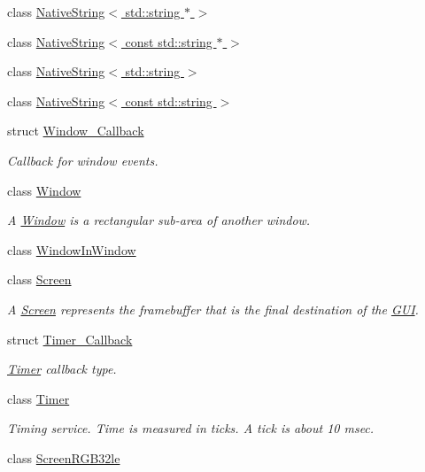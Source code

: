 \begin{DoxyCompactItemize}
class \hyperlink{classGUI_1_1NativeString_3_01std_1_1string_01_5_01_4}{Native\-String$<$ std\-::string $\ast$ $>$}
\item 
class \hyperlink{classGUI_1_1NativeString_3_01const_01std_1_1string_01_5_01_4}{Native\-String$<$ const std\-::string $\ast$ $>$}
\item 
class \hyperlink{classGUI_1_1NativeString_3_01std_1_1string_01_4}{Native\-String$<$ std\-::string $>$}
\item 
class \hyperlink{classGUI_1_1NativeString_3_01const_01std_1_1string_01_4}{Native\-String$<$ const std\-::string $>$}
\item 
struct \hyperlink{structGUI_1_1Window__Callback}{Window\-\_\-\-Callback}
\begin{DoxyCompactList}\small\item\em Callback for window events. \end{DoxyCompactList}\item 
class \hyperlink{classGUI_1_1Window}{Window}
\begin{DoxyCompactList}\small\item\em A \hyperlink{classGUI_1_1Window}{Window} is a rectangular sub-\/area of another window. \end{DoxyCompactList}\item 
class \hyperlink{classGUI_1_1WindowInWindow}{Window\-In\-Window}
\item 
class \hyperlink{classGUI_1_1Screen}{Screen}
\begin{DoxyCompactList}\small\item\em A \hyperlink{classGUI_1_1Screen}{Screen} represents the framebuffer that is the final destination of the \hyperlink{namespaceGUI}{G\-U\-I}. \end{DoxyCompactList}\item 
struct \hyperlink{structGUI_1_1Timer__Callback}{Timer\-\_\-\-Callback}
\begin{DoxyCompactList}\small\item\em \hyperlink{classGUI_1_1Timer}{Timer} callback type. \end{DoxyCompactList}\item 
class \hyperlink{classGUI_1_1Timer}{Timer}
\begin{DoxyCompactList}\small\item\em Timing service. Time is measured in ticks. A tick is about 10 msec. \end{DoxyCompactList}\item 
class \hyperlink{classGUI_1_1ScreenRGB32le}{Screen\-R\-G\-B32le}

\end{DoxyCompactItemize}
